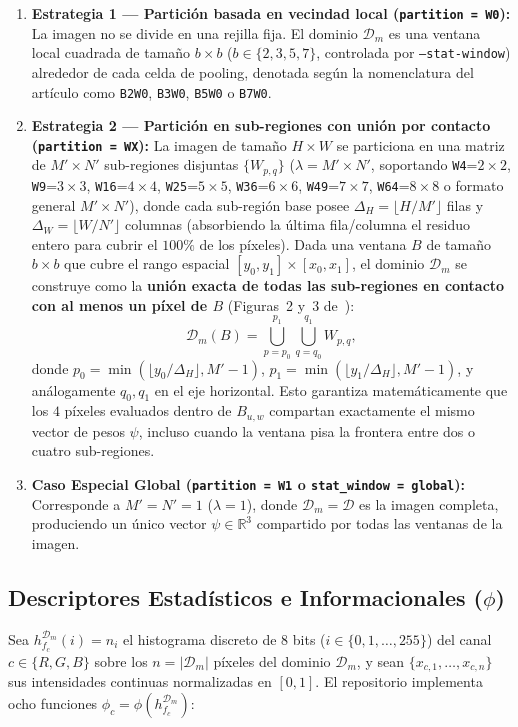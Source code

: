 \documentclass[10pt,a4paper,twocolumn]{article}
\begin{document}
\begin{enumerate}[leftmargin=*,nosep]
  \item \textbf{Estrategia 1 — Partición basada en vecindad local (\texttt{partition = W0}):}
  La imagen no se divide en una rejilla fija. El dominio $\mathcal{D}_m$ es una ventana local cuadrada de tamaño $b \times b$ ($b \in \{2, 3, 5, 7\}$, controlada por \texttt{--stat-window}) alrededor de cada celda de pooling, denotada según la nomenclatura del artículo como \texttt{B2W0}, \texttt{B3W0}, \texttt{B5W0} o \texttt{B7W0}.
  \item \textbf{Estrategia 2 — Partición en sub-regiones con unión por contacto (\texttt{partition = WX}):}
  La imagen de tamaño $H \times W$ se particiona en una matriz de $M' \times N'$ sub-regiones disjuntas $\{W_{p,q}\}$ ($\lambda = M' \times N'$, soportando \texttt{W4}=$2\times2$, \texttt{W9}=$3\times3$, \texttt{W16}=$4\times4$, \texttt{W25}=$5\times5$, \texttt{W36}=$6\times6$, \texttt{W49}=$7\times7$, \texttt{W64}=$8\times8$ o formato general $M'\times N'$), donde cada sub-región base posee $\Delta_H = \lfloor H / M' \rfloor$ filas y $\Delta_W = \lfloor W / N' \rfloor$ columnas (absorbiendo la última fila/columna el residuo entero para cubrir el $100\%$ de los píxeles). Dada una ventana $B$ de tamaño $b \times b$ que cubre el rango espacial $[y_0, y_1] \times [x_0, x_1]$, el dominio $\mathcal{D}_m$ se construye como la \textbf{unión exacta de todas las sub-regiones en contacto con al menos un píxel de $B$} (Figuras~2 y~3 de~\cite{vazquez2019adaptive}):
  \begin{equation}
    \mathcal{D}_m(B) = \bigcup_{p = p_0}^{p_1} \bigcup_{q = q_0}^{q_1} W_{p,q},
    \label{eq:domain_union}
  \end{equation}
  donde $p_0 = \min(\lfloor y_0 / \Delta_H \rfloor, M'-1)$, $p_1 = \min(\lfloor y_1 / \Delta_H \rfloor, M'-1)$, y análogamente $q_0, q_1$ en el eje horizontal. Esto garantiza matemáticamente que los $4$ píxeles evaluados dentro de $B_{u,w}$ compartan exactamente el mismo vector de pesos $\psi$, incluso cuando la ventana pisa la frontera entre dos o cuatro sub-regiones.
  \item \textbf{Caso Especial Global (\texttt{partition = W1} o \texttt{stat\_window = global}):}
  Corresponde a $M' = N' = 1$ ($\lambda = 1$), donde $\mathcal{D}_m = \mathcal{D}$ es la imagen completa, produciendo un único vector $\psi \in \mathbb{R}^3$ compartido por todas las ventanas de la imagen.
\end{enumerate}

\subsection{Descriptores Estadísticos e Informacionales ($\phi$)}
Sea $h^{\mathcal{D}_m}_{f_c}(i) = n_i$ el histograma discreto de $8$ bits ($i \in \{0, 1, \dots, 255\}$) del canal $c \in \{R, G, B\}$ sobre los $n = |\mathcal{D}_m|$ píxeles del dominio $\mathcal{D}_m$, y sean $\{x_{c,1}, \dots, x_{c,n}\}$ sus intensidades continuas normalizadas en $[0,1]$. El repositorio implementa ocho funciones $\phi_c = \phi(h^{\mathcal{D}_m}_{f_c})$:
\end{document}
